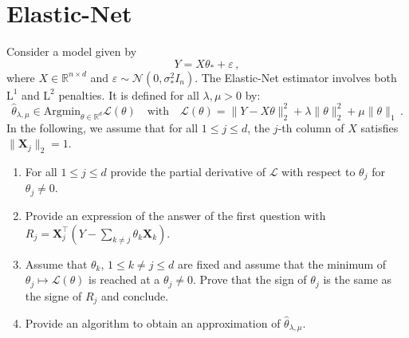 \documentclass[a4paper,10pt,fleqn]{article}
\newcommand{\1}{\ensuremath{\mathbbm{1}}}
\begin{document}
\section{Elastic-Net}
Consider a model given by 
$$
Y = X\theta_* + \varepsilon\,,
$$
where $X\in\mathbb{R}^{n\times d}$ and $\varepsilon \sim \mathcal{N}(0,\sigma_*^2I_n)$. The Elastic-Net estimator involves both $\mathrm{L}^1$ and $\mathrm{L}^2$ penalties. It is defined for all $\lambda,\mu>0$ by:
$$
\widehat{\theta}_{\lambda,\mu}\in\mathrm{Argmin}_{\theta\in\mathbb{R}^d} \mathcal{L}(\theta)\quad\mathrm{with} \quad \mathcal{L}(\theta) = \|Y-X\theta\|_2^2 + \lambda \|\theta\|_2^2 + \mu \|\theta\|_1\,.
 $$
In the following, we assume that for all $1\leq j\leq d$, the $j$-th column of $X$ satisfies $\|\mathbf{X}_j\|_2 = 1$.
\begin{enumerate}
\item For all $1\leq j \leq d$ provide the partial derivative of $\mathcal{L}$ with respect to $\theta_j$ for $\theta_j\neq 0$. 
\item Provide an expression of the answer of the first question with $R_j = \mathbf{X}_j^\top(Y - \sum_{k\neq j}\theta_k\mathbf{X}_k)$.
\item Assume that $\theta_k$, $1\leq k\neq j \leq d$ are fixed and assume that the minimum of $\theta_j \mapsto \mathcal{L}(\theta)$ is reached at a $\theta_j\neq 0$. Prove that the sign of $\theta_j$ is the same as the signe of $R_j$ and conclude.
\item Provide an algorithm to obtain an approximation of $\widehat{\theta}_{\lambda,\mu}$.
\end{enumerate}
\end{document}

